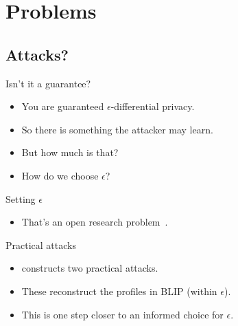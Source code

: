 \section{Problems}

\subsection{Attacks?}

\begin{frame}
  \begin{block}{Isn't it a guarantee?}
    \begin{itemize}
      \item You are guaranteed \(\epsilon\)-differential privacy.
      \item So there is something the attacker may learn.

        \pause{}

      \item But how much is that?
      \item How do we choose \(\epsilon\)?
    \end{itemize}
  \end{block}

  \pause{}

  \begin{block}{Setting \(\epsilon\)}
    \begin{itemize}
      \item That's an open research problem~\cite{ChallengingDiffPriv}.
    \end{itemize}
  \end{block}

\end{frame}

\begin{frame}
  \begin{block}{Practical attacks}
    \begin{itemize}
      \item \citet{ChallengingDiffPriv} constructs two practical attacks.
      \item These reconstruct the profiles in BLIP (within \(\epsilon\)).

        \pause{}

      \item This is one step closer to an informed choice for \(\epsilon\).
    \end{itemize}
  \end{block}
\end{frame}

